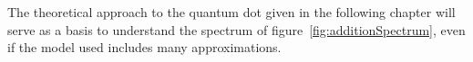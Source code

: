 The theoretical approach to the quantum dot given in the following chapter will serve as a basis to understand the spectrum of figure~\ref{fig:additionSpectrum}, even if the model used includes many approximations.

